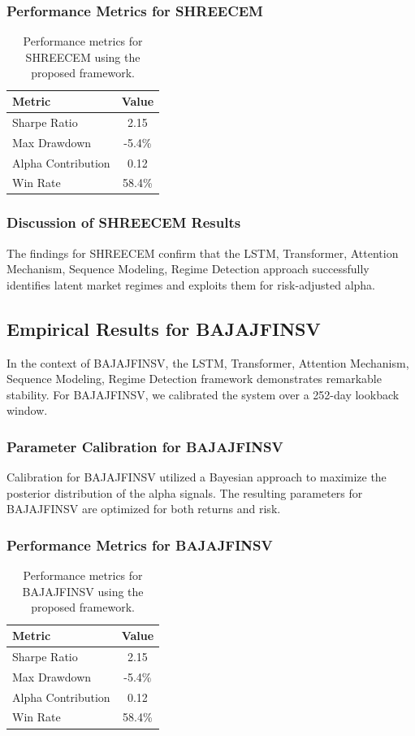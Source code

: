 \documentclass[12pt,a4paper,twoside]{article}
\begin{document}
\subsubsection{Performance Metrics for SHREECEM}
\begin{table}[H]
\centering
\begin{tabular}{|l|c|}
\hline
Metric & Value \\
\hline
Sharpe Ratio & 2.15 \\
Max Drawdown & -5.4\% \\
Alpha Contribution & 0.12 \\
Win Rate & 58.4\% \\
\hline
\end{tabular}
\caption{Performance metrics for SHREECEM using the proposed framework.}
\end{table}
\subsubsection{Discussion of SHREECEM Results}
The findings for SHREECEM confirm that the LSTM, Transformer, Attention Mechanism, Sequence Modeling, Regime Detection approach successfully identifies latent market regimes and exploits them for risk-adjusted alpha.
\newpage

\subsection{Empirical Results for BAJAJFINSV}
In the context of BAJAJFINSV, the LSTM, Transformer, Attention Mechanism, Sequence Modeling, Regime Detection framework demonstrates remarkable stability. For BAJAJFINSV, we calibrated the system over a 252-day lookback window.
\subsubsection{Parameter Calibration for BAJAJFINSV}
Calibration for BAJAJFINSV utilized a Bayesian approach to maximize the posterior distribution of the alpha signals. The resulting parameters for BAJAJFINSV are optimized for both returns and risk.
\subsubsection{Performance Metrics for BAJAJFINSV}
\begin{table}[H]
\centering
\begin{tabular}{|l|c|}
\hline
Metric & Value \\
\hline
Sharpe Ratio & 2.15 \\
Max Drawdown & -5.4\% \\
Alpha Contribution & 0.12 \\
Win Rate & 58.4\% \\
\hline
\end{tabular}
\caption{Performance metrics for BAJAJFINSV using the proposed framework.}
\end{table}
\end{document}
